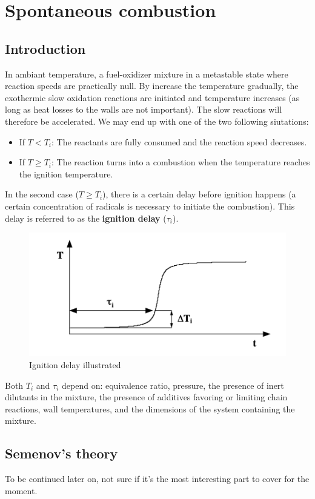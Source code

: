 \documentclass[a4paper,11pt]{article}
\begin{document}
\section{Spontaneous combustion}
\subsection{Introduction}
In ambiant temperature, a fuel-oxidizer mixture in a metastable state where reaction speeds are practically null. By increase the temperature gradually, the exothermic slow oxidation reactions are initiated and temperature increases (as long as heat losses to the walls are not important). The slow reactions will therefore be accelerated. We may end up with one of the two following siutations:
\begin{itemize}
	\item If $T < T_i$: The reactants are fully consumed and the reaction speed decreases.
	\item If $T \geq T_i$: The reaction turns into a combustion when the temperature reaches the ignition temperature.
\end{itemize}
In the second case ($T \geq T_i$), there is a certain delay before ignition happens (a certain concentration of radicals is necessary to initiate the combustion). This delay is referred to as the \textbf{ignition delay} ($\tau_i$).

\begin{figure}[h]
	\centering
	\includegraphics[width=.49\linewidth]{figures/autoinf.png}
	\caption{Ignition delay illustrated}
\end{figure}
\noindent
Both $T_i$ and $\tau_i$ depend on: equivalence ratio, pressure, the presence of inert dilutants in the mixture, the presence of additives favoring or limiting chain reactions, wall temperatures, and the dimensions of the system containing the mixture.\\

\subsection{Semenov's theory}
To be continued later on, not sure if it's the most interesting part to cover for the moment.
\pagebreak
\end{document}
